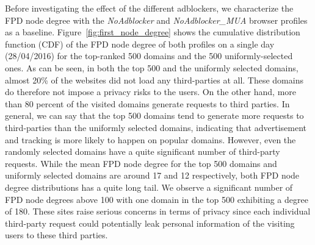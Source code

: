 \documentclass[compsoc, conference, letterpaper, 10pt, times]{IEEEtran}
\begin{document}

Before investigating the effect of the different adblockers, we characterize the FPD node degree with the \textit{NoAdblocker} and \textit{NoAdblocker\_MUA} browser profiles as a baseline. Figure~\ref{fig:first_node_degree} shows the cumulative distribution function (CDF) of the FPD node degree of both profiles on a single day (28/04/2016) for the top-ranked 500 domains and the 500 uniformly-selected ones. As can be seen, in both the top 500 and the uniformly selected domains, almost 20\% of the websites did not load any third-parties at all. These domains do therefore not impose a privacy risks to the users. On the other hand, more than 80 percent of the visited domains generate requests to third parties. In general, we can say that the top 500 domains tend to generate more requests to third-parties than the uniformly selected domains, indicating that advertisement and tracking is more likely to happen on popular domains. However, even the randomly selected domains have a quite significant number of third-party requests. While the mean FPD node degree for the top 500 domains and uniformly selected domains are around 17 and 12 respectively, both FPD node degree distributions has a quite long tail. We observe a significant number of FPD node degrees above 100 with one domain in the top 500 exhibiting a degree of 180. These sites raise serious concerns in terms of privacy since each individual third-party request could potentially leak personal information of the visiting users to these third parties.   

\end{document}
